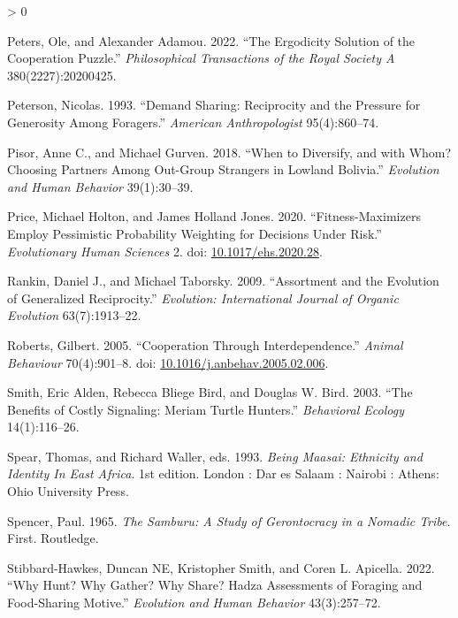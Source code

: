 \documentclass[
]{article}
\newlength{\cslhangindent}
\newenvironment{CSLReferences}[2] %
 {%
  \setlength{\parindent}{0pt}
  \ifodd #1 \everypar{\setlength{\hangindent}{\cslhangindent}}\ignorespaces\fi
  \ifnum #2 > 0
  \setlength{\parskip}{#2\baselineskip}
  \fi
 }%
 {}
\begin{document}
\begin{CSLReferences}{1}{0}
\leavevmode\hypertarget{ref-peters2022ergodicity}{}%
Peters, Ole, and Alexander Adamou. 2022. {``The Ergodicity Solution of the Cooperation Puzzle.''} \emph{Philosophical Transactions of the Royal Society A} 380(2227):20200425.

\leavevmode\hypertarget{ref-peterson1993demand}{}%
Peterson, Nicolas. 1993. {``Demand Sharing: Reciprocity and the Pressure for Generosity Among Foragers.''} \emph{American Anthropologist} 95(4):860--74.

\leavevmode\hypertarget{ref-pisor2018diversify}{}%
Pisor, Anne C., and Michael Gurven. 2018. {``When to Diversify, and with Whom? Choosing Partners Among Out-Group Strangers in Lowland Bolivia.''} \emph{Evolution and Human Behavior} 39(1):30--39.

\leavevmode\hypertarget{ref-priceFitnessmaximizersEmployPessimistic2020}{}%
Price, Michael Holton, and James Holland Jones. 2020. {``Fitness-Maximizers Employ Pessimistic Probability Weighting for Decisions Under Risk.''} \emph{Evolutionary Human Sciences} 2. doi: \href{https://doi.org/10.1017/ehs.2020.28}{10.1017/ehs.2020.28}.

\leavevmode\hypertarget{ref-rankin2009assortment}{}%
Rankin, Daniel J., and Michael Taborsky. 2009. {``Assortment and the Evolution of Generalized Reciprocity.''} \emph{Evolution: International Journal of Organic Evolution} 63(7):1913--22.

\leavevmode\hypertarget{ref-robertsCooperationInterdependence2005}{}%
Roberts, Gilbert. 2005. {``Cooperation Through Interdependence.''} \emph{Animal Behaviour} 70(4):901--8. doi: \href{https://doi.org/10.1016/j.anbehav.2005.02.006}{10.1016/j.anbehav.2005.02.006}.

\leavevmode\hypertarget{ref-smithBenefitsCostlySignaling2003a}{}%
Smith, Eric Alden, Rebecca Bliege Bird, and Douglas W. Bird. 2003. {``The Benefits of Costly Signaling: {Meriam} Turtle Hunters.''} \emph{Behavioral Ecology} 14(1):116--26.

\leavevmode\hypertarget{ref-spearBeingMaasaiEthnicity1993a}{}%
Spear, Thomas, and Richard Waller, eds. 1993. \emph{Being {Maasai}: {Ethnicity} and {Identity In East Africa}}. 1st edition. {London : Dar es Salaam : Nairobi : Athens}: {Ohio University Press}.

\leavevmode\hypertarget{ref-spencerSamburuStudyGerontocracy1965}{}%
Spencer, Paul. 1965. \emph{The {Samburu}: {A Study} of {Gerontocracy} in a {Nomadic Tribe}}. First. {Routledge}.

\leavevmode\hypertarget{ref-stibbard2022hunt}{}%
Stibbard-Hawkes, Duncan NE, Kristopher Smith, and Coren L. Apicella. 2022. {``Why Hunt? Why Gather? Why Share? Hadza Assessments of Foraging and Food-Sharing Motive.''} \emph{Evolution and Human Behavior} 43(3):257--72.


\end{CSLReferences}
\end{document}
